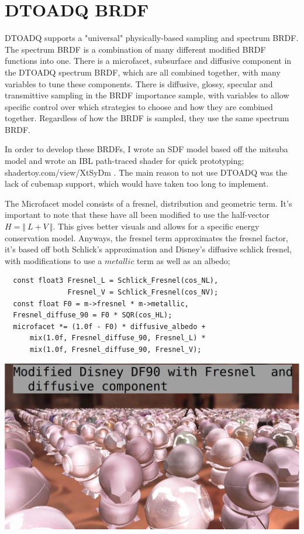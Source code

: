 \message{ !name(test.tex)}\documentclass{article}
\begin{document}
  \section{DTOADQ BRDF}
  DTOADQ supports a "universal" physically-based sampling and spectrum BRDF. The
spectrum BRDF is a combination of many different modified BRDF functions into
one. There is a microfacet, subsurface and diffusive component in the DTOADQ
spectrum BRDF, which are all combined together, with many variables to tune
these components. There is diffusive, glossy, specular and transmittive sampling
in the BRDF importance sample, with variables to allow specific control over
which strategies to choose and how they are combined together. Regardless of how
the BRDF is sampled, they use the same spectrum BRDF.
  
  In order to develop these BRDFs, I wrote an SDF model based off the mitsuba
model and wrote an IBL path-traced shader for quick prototyping;
shadertoy.com/view/XtSyDm . The main reason to not use DTOADQ was the lack of
cubemap support, which would have taken too long to implement.
  
  The Microfacet model consists of a fresnel, distribution and geometric term.
It's important to note that these have all been modified to use the half-vector
$H = \Vert\:L+V\:\Vert$. This gives better visuals and allows for a specific
energy conservation model. Anyways, the fresnel term approximates the fresnel
factor, it's based off both Schlick's approximation and Disney's diffusive
schlick fresnel, with modifications to use a $metallic$ term as well as an
albedo;
  \begin{lstlisting}
  const float3 Fresnel_L = Schlick_Fresnel(cos_NL),
               Fresnel_V = Schlick_Fresnel(cos_NV);
  const float F0 = m->fresnel * m->metallic,
  Fresnel_diffuse_90 = F0 * SQR(cos_HL);
  microfacet *= (1.0f - F0) * diffusive_albedo +
      mix(1.0f, Fresnel_diffuse_90, Fresnel_L) *
      mix(1.0f, Fresnel_diffuse_90, Fresnel_V);
  \end{lstlisting}
  \includegraphics[scale=0.20]{fresnel}
  
\end{document}
